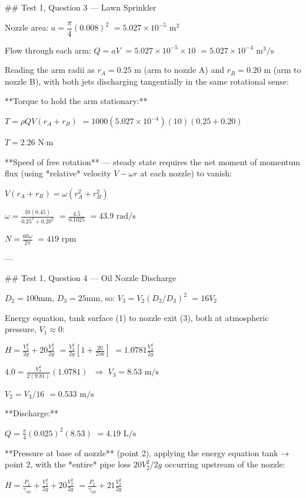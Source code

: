 ## Test 1, Question 3 — Lawn Sprinkler

Nozzle area:
$a = \dfrac{\pi}{4}(0.008)^2$
$= 5.027\times10^{-5}\text{ m}^2$

Flow through each arm:
$Q = aV$
$= 5.027\times10^{-5}\times 10$
$= 5.027\times10^{-4}\text{ m}^3/\text{s}$

Reading the arm radii as $r_A = 0.25\text{ m}$ (arm to nozzle A) and $r_B = 0.20\text{ m}$ (arm to nozzle B), with both jets discharging tangentially in the same rotational sense:

**Torque to hold the arm stationary:**

$T = \rho Q V(r_A+r_B)$
$= 1000(5.027\times10^{-4})(10)(0.25+0.20)$

$T = \boxed{2.26 \text{ N·m}}$

**Speed of free rotation** — steady state requires the net moment of momentum flux (using *relative* velocity $V-\omega r$ at each nozzle) to vanish:

$V(r_A+r_B) = \omega(r_A^2+r_B^2)$

$\omega = \frac{10(0.45)}{0.25^2+0.20^2}$
$= \frac{4.5}{0.1025}$
$= 43.9\text{ rad/s}$

$N = \frac{60\omega}{2\pi}$
$= \boxed{419 \text{ rpm}}$

---

## Test 1, Question 4 — Oil Nozzle Discharge

$D_2 = 100\text{mm}$, $D_3=25\text{mm}$, so:
$V_3 = V_2(D_2/D_3)^2$
$= 16V_2$

Energy equation, tank surface (1) to nozzle exit (3), both at atmospheric pressure, $V_1\approx0$:

$H = \frac{V_3^2}{2g} + 20\frac{V_2^2}{2g}$
$= \frac{V_3^2}{2g}\left[1+\frac{20}{256}\right]$
$= 1.0781\frac{V_3^2}{2g}$

$4.0 = \frac{V_3^2}{2(9.81)}(1.0781)$
$\;\Rightarrow\; V_3 = \boxed{8.53\text{ m/s}}$

$V_2 = V_3/16$
$= 0.533\text{ m/s}$

**Discharge:**

$Q = \frac{\pi}{4}(0.025)^2(8.53)$
$= \boxed{4.19\text{ L/s}}$

**Pressure at base of nozzle** (point 2), applying the energy equation tank → point 2, with the *entire* pipe loss $20V_2^2/2g$ occurring upstream of the nozzle:

$H = \frac{P_2}{\gamma_{oil}} + \frac{V_2^2}{2g} + 20\frac{V_2^2}{2g}$
$= \frac{P_2}{\gamma_{oil}} + 21\frac{V_2^2}{2g}$

